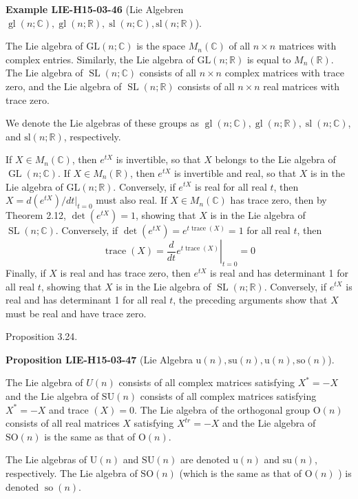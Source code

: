 \documentclass[10pt, letterpaper]{article}
\newcommand{\CustomHeading}[3]{%
  \par\medskip\noindent%
  \textbf{#1 #2} \textnormal{(#3)}.\enskip%
}
\newenvironment{PROP}[2]{\begin{unitbox}\CustomHeading{Proposition}{#1}{#2}}{\end{unitbox}}
\newenvironment{EXA}[2]{\begin{unitbox}\CustomHeading{Example}{#1}{#2}}{\end{unitbox}}
\begin{document}
\begin{EXA}{LIE-H15-03-46}{Lie Algebren $\operatorname{gl}(n ; \mathbb{C}), \operatorname{gl}(n ; \mathbb{R}), \operatorname{sl}(n ; \mathbb{C}), \mathrm{sl}(n ; \mathbb{R})$}
The Lie algebra of $\mathrm{GL}(n ; \mathbb{C})$ is the space $M_{n}(\mathbb{C})$ of all $n \times n$ matrices with complex entries. Similarly, the Lie algebra of $\mathrm{GL}(n ; \mathbb{R})$ is equal to $M_{n}(\mathbb{R})$. The Lie algebra of $\operatorname{SL}(n ; \mathbb{C})$ consists of all $n \times n$ complex matrices with trace zero, and the Lie algebra of $\operatorname{SL}(n ; \mathbb{R})$ consists of all $n \times n$ real matrices with trace zero.

We denote the Lie algebras of these groups as $\operatorname{gl}(n ; \mathbb{C}), \operatorname{gl}(n ; \mathbb{R}), \operatorname{sl}(n ; \mathbb{C})$, and $\mathrm{sl}(n ; \mathbb{R})$, respectively.

If $X \in M_{n}(\mathbb{C})$, then $e^{t X}$ is invertible, so that $X$ belongs to the Lie algebra of $\operatorname{GL}(n ; \mathbb{C})$. If $X \in M_{n}(\mathbb{R})$, then $e^{t X}$ is invertible and real, so that $X$ is in the Lie algebra of $\mathrm{GL}(n ; \mathbb{R})$. Conversely, if $e^{t X}$ is real for all real $t$, then $X= d\left(e^{t X}\right) /\left.d t\right|_{t=0}$ must also real. If $X \in M_{n}(\mathbb{C})$ has trace zero, then by Theorem 2.12, $\operatorname{det}\left(e^{t X}\right)=1$, showing that $X$ is in the Lie algebra of $\operatorname{SL}(n ; \mathbb{C})$. Conversely, if $\operatorname{det}\left(e^{t X}\right)=e^{t \operatorname{trace}(X)}=1$ for all real $t$, then
$$
\operatorname{trace}(X)=\left.\frac{d}{d t} e^{t \operatorname{trace}(X)}\right|_{t=0}=0
$$
Finally, if $X$ is real and has trace zero, then $e^{t X}$ is real and has determinant 1 for all real $t$, showing that $X$ is in the Lie algebra of $\operatorname{SL}(n ; \mathbb{R})$. Conversely, if $e^{t X}$ is real and has determinant 1 for all real $t$, the preceding arguments show that $X$ must be real and have trace zero.
\end{EXA}


Proposition 3.24. 


\begin{PROP}{LIE-H15-03-47}{Lie Algebra $\mathrm{u}(n),\mathrm{su}(n),\mathrm{u}(n),\mathrm{so}(n)$}
The Lie algebra of $U(n)$ consists of all complex matrices satisfying $X^{*}=-X$ and the Lie algebra of $\mathrm{SU}(n)$ consists of all complex matrices satisfying $X^{*}=-X$ and trace $(X)=0$. The Lie algebra of the orthogonal group $\mathrm{O}(n)$ consists of all real matrices $X$ satisfying $X^{t r}=-X$ and the Lie algebra of $\mathrm{SO}(n)$ is the same as that of $\mathrm{O}(n)$.

The Lie algebras of $\mathrm{U}(n)$ and $\mathrm{SU}(n)$ are denoted $\mathrm{u}(n)$ and $\mathrm{su}(n)$, respectively. The Lie algebra of $\mathrm{SO}(n)$ (which is the same as that of $\mathrm{O}(n)$ ) is denoted $\operatorname{so}(n)$.
\end{PROP}
\end{document}
